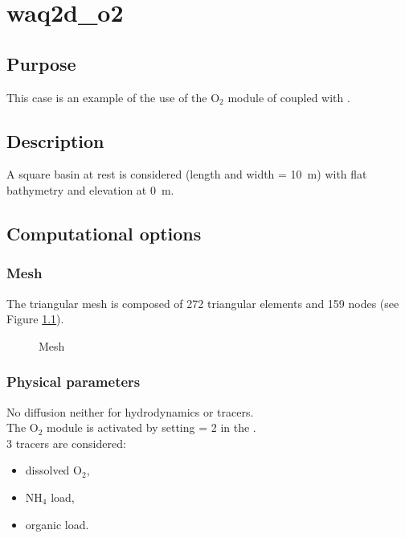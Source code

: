 \chapter{waq2d\_o2}

\section{Purpose}

This case is an example of the use of the O$_2$ module of \waqtel coupled with
.

\section{Description}

A square basin at rest is considered (length and width = 10~m)
with flat bathymetry and elevation at 0~m.

\section{Computational options}

\subsection{Mesh}

The triangular mesh is composed of 272 triangular elements and 159 nodes
(see Figure \ref{fig:waq2d_o2:mesh}).

\begin{figure}[H]
 \centering
\caption{Mesh}
 \label{fig:waq2d_o2:mesh}
\end{figure}

\subsection{Physical parameters}

No diffusion neither for hydrodynamics or tracers.\\

The O$_2$ module is activated by setting  = 2
in the  .\\

3 tracers are considered:
\begin{itemize}
\item dissolved O$_2$,
\item NH$_4$ load,
\item organic load.
\end{itemize}

